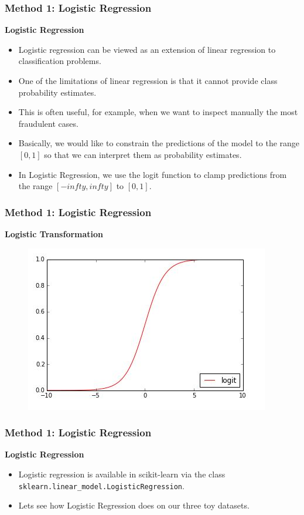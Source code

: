 \documentclass[MASTER.tex]{subfiles}
\begin{document}
\begin{frame}
		\frametitle{Method 1: Logistic Regression}
\textbf{Logistic Regression}
\begin{itemize}
\item Logistic regression can be viewed as an extension of linear regression to classification problems. \item One of the limitations of linear regression is that it cannot provide class probability estimates. 
\item This is often useful, for example, when we want to inspect manually the most fraudulent cases. 
\item Basically, we would like to constrain the predictions of the model to the range $[0,1]$ so that we can interpret them as probability estimates. 
\item In Logistic Regression, we use the logit function to clamp predictions from the range $[−infty,infty]$ to $[0,1]$. 
\end{itemize}

\end{frame}
\begin{frame}
		\frametitle{Method 1: Logistic Regression}
	\textbf{Logistic Transformation}
	\begin{figure}
\centering
\includegraphics[width=0.7\linewidth]{sklcass/sklclass13}

\end{figure}

\end{frame}
\begin{frame}
		\frametitle{Method 1: Logistic Regression}
	\Large
	\textbf{Logistic Regression}
\begin{itemize}
\item Logistic regression is available in scikit-learn via the class \texttt{sklearn.linear\_model.LogisticRegression}. 
\item Lets see how Logistic Regression does on our three toy datasets.
\end{itemize}

\end{frame}
\end{document}
